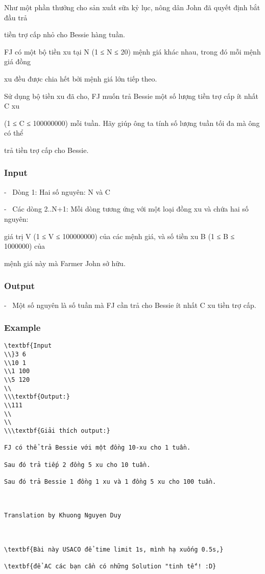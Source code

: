 



   Như một phần thưởng cho sản xuất sữa kỷ lục, nông dân John đã quyết định bắt đầu trả  

   tiền trợ cấp nhỏ cho Bessie hàng tuần.  

   FJ có một bộ tiền xu tại N (1 ≤ N ≤ 20) mệnh giá khác nhau, trong đó mỗi mệnh giá đồng  

   xu đều được chia hết bởi mệnh giá lớn tiếp theo.  

   Sử dụng bộ tiền xu đã cho, FJ muốn trả Bessie một số lượng tiền trợ cấp ít nhất C xu  

   (1 ≤ C ≤ 100000000) mỗi tuần. Hãy giúp ông ta tính số lượng tuần tối đa mà ông có thể  

   trả tiền trợ cấp cho Bessie.  

\subsubsection{   Input  }

   -  Dòng 1: Hai số nguyên: N và C  

   -  Các dòng 2..N+1: Mỗi dòng tương ứng với một loại đồng xu và chứa hai số nguyên:  

   giá trị V (1 ≤ V ≤ 100000000) của các mệnh giá, và số tiền xu B (1 ≤ B ≤ 1000000) của  

   mệnh giá này mà Farmer John sở hữu.  

\subsubsection{   Output  }

   -  Một số nguyên là số tuần mà FJ cần trả cho Bessie ít nhất C xu tiền trợ cấp.  

\subsubsection{   Example  }
\begin{verbatim}
\textbf{Input
\\}3 6
\\10 1
\\1 100
\\5 120
\\
\\\textbf{Output:}
\\111
\\
\\
\\\textbf{Giải thích output:}

FJ có thể trả Bessie với một đồng 10-xu cho 1 tuần.

Sau đó trả tiếp 2 đồng 5 xu cho 10 tuần.

Sau đó trả Bessie 1 đồng 1 xu và 1 đồng 5 xu cho 100 tuần.

 

Translation by Khuong Nguyen Duy

 

\textbf{Bài này USACO để time limit 1s, mình hạ xuống 0.5s,}

\textbf{để AC các bạn cần có những Solution "tinh tế"! :D}\end{verbatim}
